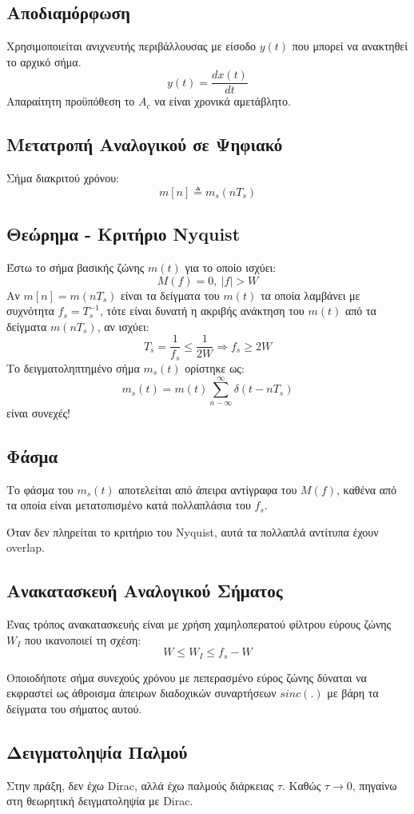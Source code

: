 \documentclass[a4paper,12pt]{article}
\begin{document}
\subsection*{Αποδιαμόρφωση}
Χρησιμοποιείται ανιχνευτής περιβάλλουσας με είσοδο \(y(t)\) που μπορεί να ανακτηθεί το αρχικό σήμα.
\[
y(t) = \frac{dx(t)}{dt}
\]
Απαραίτητη προϋπόθεση το \(A_c\) να είναι χρονικά αμετάβλητο.

\subsection*{Μετατροπή Αναλογικού σε Ψηφιακό}
Σήμα διακριτού χρόνου:
\[
m[n] \triangleq m_s(nT_s)
\]

\subsection*{Θεώρημα - Κριτήριο Nyquist}
Έστω το σήμα βασικής ζώνης \(m(t)\) για το οποίο ισχύει:
\[
M(f)=0, \ |f|>W
\]
Αν \(m[n]=m(nT_s)\) είναι τα δείγματα του \(m(t)\) τα οποία λαμβάνει με συχνότητα \(f_s=T^{-1}_s\),  τότε είναι δυνατή η ακριβής ανάκτηση του \(m(t)\) από τα δείγματα \(m(nT_s)\), αν ισχύει:
\[
T_s=\frac{1}{f_s}\leq \frac{1}{2W} \Rightarrow f_s \geq 2W
\]
Το δειγματοληπτημένο σήμα \(m_s(t)\) ορίστηκε ως:
\[
m_s(t)=m(t) \sum_{n-\infty}^{\infty} \delta(t-nT_s)
\]
είναι συνεχές!

\subsection*{Φάσμα}
Το φάσμα του \(m_s(t)\) αποτελείται από άπειρα αντίγραφα του \(M(f)\), καθένα από τα οποία είναι μετατοπισμένο κατά πολλαπλάσια του \(f_s\).

Όταν δεν πληρείται το κριτήριο του Nyquist, αυτά τα πολλαπλά αντίτυπα έχουν overlap.

\subsection*{Ανακατασκευή Αναλογικού Σήματος}
Ένας τρόπος ανακατασκευής είναι με χρήση χαμηλοπερατού φίλτρου εύρους ζώνης \(W_I\) που ικανοποιεί τη σχέση:
\[
W \leq W_I \leq f_s-W
\]

Οποιοδήποτε σήμα συνεχούς χρόνου με πεπερασμένο εύρος ζώνης δύναται να εκφραστεί ως άθροισμα άπειρων διαδοχικών συναρτήσεων \(sinc(.)\) με βάρη τα δείγματα του σήματος αυτού.

\subsection*{Δειγματοληψία Παλμού}
Στην πράξη, δεν έχω Dirac, αλλά έχω παλμούς διάρκειας \(\tau\). Καθώς \(\tau \rightarrow 0\), πηγαίνω στη θεωρητική δειγματοληψία με Dirac.
\end{document}
